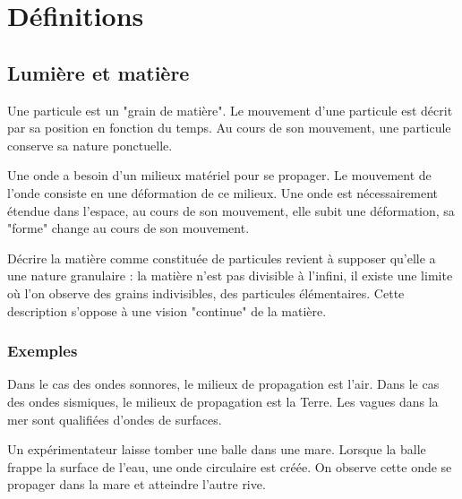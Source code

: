 
\section{Définitions}
%
\subsection{Lumière et matière}

Une particule est un "grain de matière". Le mouvement d'une particule est décrit par sa position en fonction du temps. Au cours de son mouvement, une particule conserve sa nature ponctuelle.


Une onde a besoin d'un milieux matériel pour se propager. Le mouvement de l'onde consiste en une déformation de ce milieux. Une onde est nécessairement étendue dans l'espace, au cours de son mouvement, elle subit une déformation, sa "forme" change au cours de son mouvement.


Décrire la matière comme constituée de particules revient à supposer qu'elle a une nature granulaire : la matière n'est pas divisible à l'infini, il existe une limite où l'on observe des grains indivisibles, des particules élémentaires. Cette description s'oppose à une vision "continue" de la matière.

\subsubsection{Exemples}

Dans le cas des ondes sonnores, le milieux de propagation est l'air. Dans le cas des ondes sismiques, le milieux de propagation est la Terre. Les vagues dans la mer sont qualifiées d'ondes de surfaces.

\vspace{0.5cm}
\begin{minipage}[c]{.45\linewidth}

\end{minipage}
\hfill
\begin{minipage}[c]{.45\linewidth}
Un expérimentateur laisse tomber une balle dans une mare. Lorsque la balle frappe la surface de l'eau, une onde circulaire est créée. On observe cette onde se propager dans la mare et atteindre l'autre rive.
\end{minipage}

